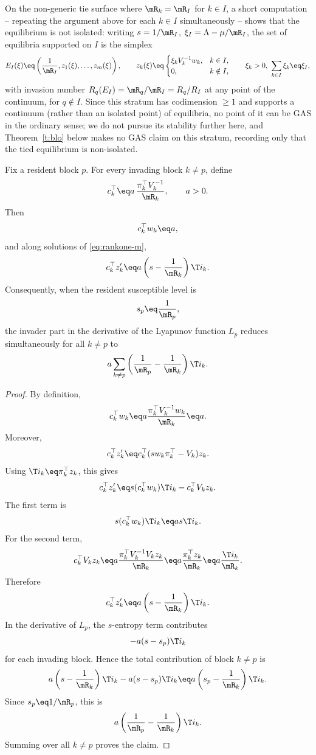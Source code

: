 On the non-generic tie surface where $\mR_k=\mR_I$ for $k\in I$, a
short computation -- repeating the argument above for each $k\in I$
simultaneously -- shows that the equilibrium is not isolated: writing
$s=1/\mR_I$, $\xi_I=\Lambda-\mu/\mR_I$, the set of equilibria
supported on $I$ is the simplex
\[
E_I(\xi)
\eq
\left(
\frac1{\mR_I},
z_1(\xi),\ldots,z_m(\xi)
\right),
\qquad
z_k(\xi)
\eq
\begin{cases}
\xi_kV_k^{-1}w_k, & k\in I,\\
0, & k\notin I,
\end{cases}
\qquad
\xi_k>0,\ \sum_{k\in I}\xi_k\eq\xi_I,
\]
with invasion number $R_q(E_I)=\mR_q/\mR_I=R_q/R_I$ at any point of
the continuum, for $q\notin I$.  Since this stratum has codimension
$\ge1$ and supports a continuum (rather than an isolated point) of
equilibria, no point of it can be GAS in the ordinary sense; we do not
pursue its stability further here, and Theorem~\ref{t:blo}
below makes no GAS claim on this stratum, recording only that the
tied equilibrium is non-isolated.
\eeR


Fix a resident block $p$. For every invading block $k\ne p$, define
\[
c_k^\top
\eq
a\,\frac{\pi_k^\top V_k^{-1}}{\mR_k},
\qquad
a>0.
\]
Then
\[
c_k^\top w_k
\eq
a,
\]
and along solutions of \eqref{eq:rankone-m},
\[
c_k^\top z_k'
\eq
a\left(s-\frac1{\mR_k}\right)\T i_k.
\]
Consequently, when the resident susceptible level is
\[
s_p
\eq
\frac1{\mR_p},
\]
the invader part in the derivative of the Lyapunov function $L_p$ reduces
simultaneously for all $k\ne p$ to
\[
a\sum_{k\ne p}
\left(
\frac1{\mR_p}-\frac1{\mR_k}
\right)\T i_k.
\]
\eeL

\begin{proof}
By definition,
\[
c_k^\top w_k
\eq
a\frac{\pi_k^\top V_k^{-1}w_k}{\mR_k}
\eq
a.
\]
Moreover,
\[
c_k^\top z_k'
\eq
c_k^\top(sw_k\pi_k^\top-V_k)z_k.
\]
Using $\T i_k\eq\pi_k^\top z_k$, this gives
\[
c_k^\top z_k'
\eq
s(c_k^\top w_k)\T i_k-c_k^\top V_kz_k.
\]
The first term is
\[
s(c_k^\top w_k)\T i_k
\eq
as\T i_k.
\]
For the second term,
\[
c_k^\top V_kz_k
\eq
a\frac{\pi_k^\top V_k^{-1}V_kz_k}{\mR_k}
\eq
a\frac{\pi_k^\top z_k}{\mR_k}
\eq
a\frac{\T i_k}{\mR_k}.
\]
Therefore
\[
c_k^\top z_k'
\eq
a\left(s-\frac1{\mR_k}\right)\T i_k.
\]
In the derivative of $L_p$, the $s$-entropy term contributes
\[
-a(s-s_p)\T i_k
\]
for each invading block. Hence the total contribution of block $k\ne p$ is
\[
a\left(s-\frac1{\mR_k}\right)\T i_k
-
a(s-s_p)\T i_k
\eq
a\left(s_p-\frac1{\mR_k}\right)\T i_k.
\]
Since $s_p\eq1/\mR_p$, this is
\[
a\left(
\frac1{\mR_p}-\frac1{\mR_k}
\right)\T i_k.
\]
Summing over all $k\ne p$ proves the claim.
\end{proof}

